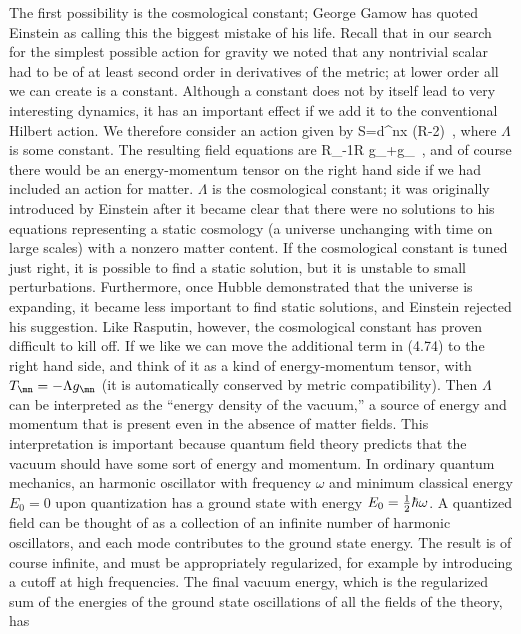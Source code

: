 \documentclass[12pt]{article}
\begin{document}
The first possibility is the cosmological constant; George Gamow
has quoted Einstein as calling this the biggest mistake of his
life.  Recall that in our search for the simplest possible action
for gravity we noted that any nontrivial scalar had to be of at
least second order in derivatives of the metric; at lower order all
we can create is a constant.  Although a constant does not by itself
lead to very interesting dynamics, it has an important effect if we
add it to the conventional Hilbert action.  We therefore consider
an action given by
\be
  S=\int d^nx \g(R-2\Lambda)\ ,\label{4.73}
\ee
where $\Lambda$ is some constant.  The resulting field equations 
are 
\be
  R_\mn -{1}R g_\mn +\Lambda g_\ ,\label{4.74}
\ee
and of course there would be an energy-momentum tensor on the
right hand side if we had included an action for matter.  $\Lambda$
is the cosmological constant; it was originally introduced by 
Einstein after it became clear that there were no solutions to his
equations representing a static cosmology (a universe unchanging
with time on large scales) with a nonzero matter content.  If the
cosmological constant is tuned just right, it is possible to find
a static solution, but it is unstable to small perturbations.
Furthermore, once Hubble demonstrated that the universe is expanding,
it became less important to find static solutions, and Einstein
rejected his suggestion.  Like Rasputin, however, the cosmological
constant has proven difficult to kill off.  If we like we can move
the additional term in (4.74) to the right hand side, and think
of it as a kind of energy-momentum tensor, with $T_\mn = -
\Lambda g_\mn$ (it is automatically conserved by metric compatibility).
Then $\Lambda$ can be interpreted as the ``energy density of the
vacuum,'' a source of energy and momentum that is present even in
the absence of matter fields.  This interpretation is important because
quantum field theory predicts that the vacuum should have some sort
of energy and momentum.  In ordinary quantum mechanics, an harmonic
oscillator with frequency $\omega$ and minimum classical energy
$E_0=0$ upon quantization has a ground state with energy
$E_0={1\over 2}\hbar\omega$.  A quantized field can be thought of
as a collection of an infinite number of harmonic oscillators, and
each mode contributes to the ground state energy.  The result is
of course infinite, and must be appropriately regularized, for 
example by introducing a cutoff at high frequencies.  The final
vacuum energy, which is the regularized sum of the energies of
the ground state oscillations of all the fields of the theory, has
\end{document}
